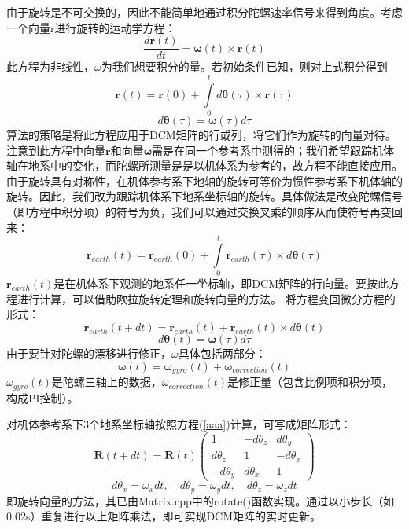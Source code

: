 \documentclass[a4paper,10pt]{ctexart} %
\begin{document}
由于旋转是不可交换的，因此不能简单地通过积分陀螺速率信号来得到角度。考虑一个向量r进行旋转的运动学方程：
\begin{equation}
\frac{d\mathbf{r}(t)}{dt}=\mathbf{\omega}(t)\times\mathbf{r}(t)
\end{equation}
此方程为非线性，$\omega$为我们想要积分的量。若初始条件已知，则对上式积分得到
\begin{equation}
\mathbf{r}(t)=\mathbf{r}(0)+\int\limits_{0}^{t}d\mathbf{\theta}(\tau)\times\mathbf{r}(\tau)
\end{equation}
\begin{displaymath}
d\mathbf{\theta}(\tau)=\mathbf{\omega}(\tau)d\tau
\end{displaymath}
算法的策略是将此方程应用于DCM矩阵的行或列，将它们作为旋转的向量对待。
注意到此方程中向量$\mathbf{r}$和向量$\mathbf{\omega}$需是在同一个参考系中测得的；我们希望跟踪机体轴在地系中的变化，而陀螺所测量是是以机体系为参考的，故方程不能直接应用。由于旋转具有对称性，在机体参考系下地轴的旋转可等价为惯性参考系下机体轴的旋转。因此，我们改为跟踪机体系下地系坐标轴的旋转。具体做法是改变陀螺信号（即方程中积分项）的符号为负，我们可以通过交换叉乘的顺序从而使符号再变回来：
\begin{equation}
\mathbf{r}_{earth}(t)=\mathbf{r}_{earth}(0)+\int\limits_{0}^{t}\mathbf{r}_{earth}(\tau)\times d\mathbf{\theta}(\tau)
\end{equation}
$\mathbf{r}_{earth}(t)$是在机体系下观测的地系任一坐标轴，即DCM矩阵的行向量。要按此方程进行计算，可以借助欧拉旋转定理和旋转向量的方法。
将方程变回微分方程的形式：
\begin{equation}\label{aaa}
\mathbf{r}_{earth}(t+dt)=\mathbf{r}_{earth}(t)+\mathbf{r}_{earth}(t)\times d\mathbf{\theta}(t)
\end{equation}
\begin{displaymath}
d\mathbf{\theta}(t)=\mathbf{\omega}(\tau)d\tau
\end{displaymath}
由于要针对陀螺的漂移进行修正，$\omega$具体包括两部分：
\begin{equation}
\mathbf{\omega}(t)=\mathbf{\omega}_{gyro}(t)+\mathbf{\omega}_{correction}(t)	%
\end{equation}
$\omega_{gyro}(t)$是陀螺三轴上的数据，$\omega_{correction}(t)$是修正量（包含比例项和积分项，构成PI控制）。

对机体参考系下3个地系坐标轴按照方程(\ref{aaa})计算，可写成矩阵形式：
\begin{equation}
\mathbf{R}(t+dt)=\mathbf{R}(t)
\left( \begin{array}{ccc}
	    1      & -d\theta_z & d\theta_y  \\
	d\theta_z  &     1      & -d\theta_x \\
	-d\theta_y & d\theta_x  &     1
\end{array} \right)
\end{equation}
\begin{displaymath}
d\theta_x=\omega_xdt,\quad
d\theta_y=\omega_ydt,\quad
d\theta_z=\omega_zdt
\end{displaymath}
即旋转向量的方法，其已由Matrix.cpp中的rotate()函数实现。通过以小步长（如0.02s）重复进行以上矩阵乘法，即可实现DCM矩阵的实时更新。
\end{document}
